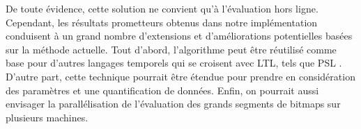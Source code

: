 De toute évidence, cette solution ne convient qu'à l'évaluation hors ligne. Cependant, les résultats prometteurs obtenus dans notre implémentation conduisent à un grand nombre d'extensions et d'améliorations potentielles basées sur la méthode actuelle. Tout d'abord, l'algorithme peut être réutilisé comme base pour d'autres langages temporels qui se croisent avec LTL, tels que PSL \citep{IntroPSLBook}. D'autre part, cette technique pourrait être étendue pour prendre en considération des paramètres et une quantification de données. Enfin, on pourrait aussi envisager la parallélisation de l'évaluation des grands segments de bitmaps sur plusieurs machines.

